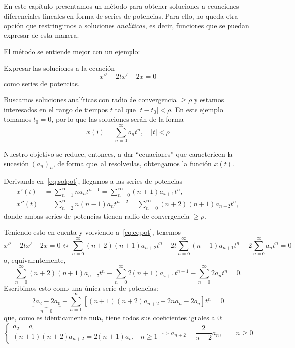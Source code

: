 \documentclass[../main.tex]{subfiles}
\begin{document}
En este capítulo presentamos un método para obtener soluciones a ecuaciones
diferenciales lineales en forma de series de potencias. Para ello, no queda otra
opción que restringirnos a soluciones \emph{analíticas}, es decir, funciones que
se puedan expresar de esta manera.

El método se entiende mejor con un ejemplo:

\begin{example}
  Expresar las soluciones a la ecuación
  \begin{equation} \label{eq:eqpot}
    x''-2tx'-2x=0
  \end{equation}
  como series de potencias.

  Buscamos soluciones analíticas con radio de convergencia \(\geq \rho\) y
  estamos interesados en el rango de tiempos \(t\) tal que \(|t-t_0| <
  \rho\). En este ejemplo tomamos \(t_0 = 0\), por lo que las soluciones serán
  de la forma
  \begin{equation}
    \label{eq:solpot}
    x(t) = \sum_{n=0}^\infty a_nt^n, \quad |t| < \rho
  \end{equation}

  Nuestro objetivo se reduce, entonces, a dar ``ecuaciones'' que caractericen la
  sucesión \((a_n)_n\), de forma que, al resolverlas, obtengamos la función \(x(t)\).

  Derivando en~\eqref{eq:solpot}, llegamos a las series de potencias
	\begin{align*}
		x'(t) &= \sum_{n=1}^\infty na_nt^{n-1} = \sum_{n=0}^\infty (n+1)a_{n+1}t^n, \\
		x''(t) &= \sum_{n=2}^\infty n(n-1)a_nt^{n-2} = \sum_{n=0}^\infty (n+2)(n+1)a_{n+2}t^n,
	\end{align*}
donde ambas series de potencias tienen radio de convergencia \(\geq \rho\).

Teniendo esto en cuenta y volviendo a~\eqref{eq:eqpot}, tenemos
\[x''-2tx'-2x=0 \leftrightsquigarrow \sum_{n=0}^\infty (n+2)(n+1)a_{n+2}t^n -
  2t \sum_{n=0}^\infty (n+1)a_{n+1}t^n - 2 \sum_{n=0}^\infty a_nt^n = 0\]
o, equivalentemente,
\[\sum_{n=0}^\infty (n+2)(n+1)a_{n+2}t^n - \sum_{n=0}^\infty
  2(n+1)a_{n+1}t^{n+1} - \sum_{n=0}^\infty 2a_nt^n = 0.\]
Escribimos esto como una única serie de potencias:
\[\underbrace{2a_2-2a_0}_{n=0} +
  \sum_{n=1}^\infty[(n+1)(n+2)a_{n+2}-2na_n-2a_n]t^n = 0\]
que, como es idénticamente nula, tiene todos sus coeficientes iguales a 0:
\begin{equation}
  \label{eq:seqpot}
  \begin{cases}
    a_2 = a_0 \\
    (n+1)(n+2)a_{n+2} = 2(n+1)a_n, & n \geq 1
  \end{cases} \iff
  a_{n+2} = \frac{2}{n+2} a_n, \qquad n \geq 0
\end{equation}


\end{example}
\end{document}
